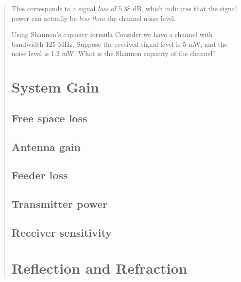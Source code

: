 \begin{quote}
This corresponds to a signal \textit{loss} of 5.38 dB, which indicates
that the signal power can actually be \textit{less than} the channel
noise level.

\begin{exercise}{Using Shannon's capacity formula}
Consider we have a channel with bandwidth 125 MHz. Suppose the received
signal level is 5 mW, and the noise level is 1.2 mW. What is the Shannon capacity of
the channel?
\end{exercise}


\section{System Gain}

\subsection{Free space loss}

\subsection{Antenna gain}

\subsection{Feeder loss}

\subsection{Transmitter power}

\subsection{Receiver sensitivity}


\section{Reflection and Refraction}


\end{quote}
